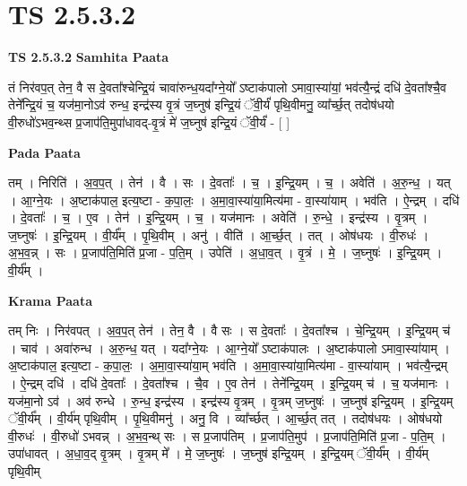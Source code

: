 \documentclass[17pt]{extarticle}
\begin{document}
\section*{ TS 2.5.3.2 }

\textbf{TS 2.5.3.2 } \newline
\textbf{Samhita Paata} \newline

तं निर॑वप॒त् तेन॒ वै स दे॒वता᳚श्चेन्द्रि॒यं चावा॑रुन्ध॒यदा᳚ग्ने॒यो᳚ ऽष्टाक॑पालो ऽमावा॒स्या॑यां॒ भव॑त्यै॒न्द्रं दधि॑ दे॒वता᳚श्चै॒व तेने᳚न्द्रि॒यं च॒ यज॑मा॒नोऽव॑ रुन्ध॒ इन्द्र॑स्य वृ॒त्रं ज॒घ्नुष॑ इन्द्रि॒यं ॅवी॒र्यं॑ पृथि॒वीमनु॒ व्या᳚र्च्छ॒त् तदोष॑धयो वी॒रुधो॑ऽभव॒न्थ्स प्र॒जाप॑ति॒मुपा॑धावद्-वृ॒त्रं मे॑ ज॒घ्नुष॑ इन्द्रि॒यं ॅवी॒र्यं॑ - [  ] \newline

\textbf{Pada Paata} \newline

तम् । निरिति॑ । अ॒व॒प॒त् । तेन॑ । वै । सः । दे॒वताः᳚ । च॒ । इ॒न्द्रि॒यम् । च॒ । अवेति॑ । अ॒रु॒न्ध॒ । यत् । आ॒ग्ने॒यः । अ॒ष्टाक॑पाल॒ इत्य॒ष्टा - क॒पा॒लः॒ । अ॒मा॒वा॒स्या॑या॒मित्य॑मा - वा॒स्या॑याम् । भव॑ति । ऐ॒न्द्रम् । दधि॑ । दे॒वताः᳚ । च॒ । ए॒व । तेन॑ । इ॒न्द्रि॒यम् । च॒ । यज॑मानः । अवेति॑ । रु॒न्धे॒ । इन्द्र॑स्य । वृ॒त्रम् । ज॒घ्नुषः॑ । इ॒न्द्रि॒यम् । वी॒र्य᳚म् । पृ॒थि॒वीम् । अनु॑ । वीति॑ । आ॒र्च्छ॒त् । तत् । ओष॑धयः । वी॒रुधः॑ । अ॒भ॒व॒न्न् । सः । प्र॒जाप॑ति॒मिति॑ प्र॒जा - प॒ति॒म् । उपेति॑ । अ॒धा॒व॒त् । वृ॒त्रं । मे॒ । ज॒घ्नुषः॑ । इ॒न्द्रि॒यम् । वी॒र्य᳚म् ।  \newline


\textbf{Krama Paata} \newline

तम् निः । निर॑वपत् । अ॒व॒प॒त् तेन॑ । तेन॒ वै । वै सः । स दे॒वताः᳚ । दे॒वता᳚श्च । चे॒न्द्रि॒यम् । इ॒न्द्रि॒यम् च॑ । चाव॑ । अवा॑रुन्ध । अ॒रु॒न्ध॒ यत् । यदा᳚ग्ने॒यः । आ॒ग्ने॒यो᳚ ऽष्टाक॑पालः । अ॒ष्टाक॑पालो ऽमावा॒स्या॑याम् । अ॒ष्टाक॑पाल॒ इत्य॒ष्टा - क॒पा॒लः॒ । अ॒मा॒वा॒स्या॑या॒म् भव॑ति । अ॒मा॒वा॒स्या॑या॒मित्य॑मा - वा॒स्या॑याम् । भव॑त्यै॒न्द्रम् । ऐ॒न्द्रम् दधि॑ । दधि॑ दे॒वताः᳚ । दे॒वता᳚श्च । चै॒व । ए॒व तेन॑ । तेने᳚न्द्रि॒यम् । इ॒न्द्रि॒यम् च॑ । च॒ यज॑मानः । यज॑मा॒नो ऽव॑ । अव॑ रुन्धे । रु॒न्ध॒ इन्द्र॑स्य । इन्द्र॑स्य वृ॒त्रम् । वृ॒त्रम् ज॒घ्नुषः॑ । ज॒घ्नुष॑ इन्द्रि॒यम् । इ॒न्द्रि॒यम् ॅवी॒र्य᳚म् । वी॒र्य॑म् पृथि॒वीम् । पृ॒थि॒वीमनु॑ । अनु॒ वि । व्या᳚र्च्छत् । आ॒र्च्छ॒त् तत् । तदोष॑धयः । ओष॑धयो वी॒रुधः॑ । वी॒रुधो॑ ऽभवन्न् । अ॒भ॒व॒न्थ् सः । स प्र॒जाप॑तिम् । प्र॒जाप॑ति॒मुप॑ । प्र॒जाप॑ति॒मिति॑ प्र॒जा - प॒ति॒म् । उपा॑धावत् । अ॒धा॒व॒द् वृ॒त्रम् । वृ॒त्रम् मे᳚ । मे॒ ज॒घ्नुषः॑ । ज॒घ्नुष॑ इन्द्रि॒यम् । इ॒न्द्रि॒यम् ॅवी॒र्य᳚म् । वी॒र्य॑म् पृथि॒वीम् \newline
\end{document}
